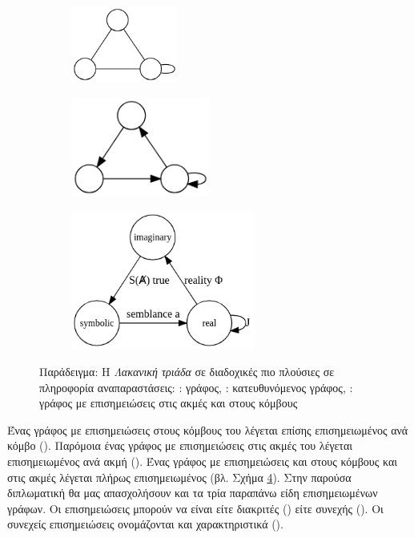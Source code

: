 \begin{figure}[ht]%
\centering
  \begin{subfigure}[α]{0.33\linewidth}
    \centering\includegraphics[width=100pt]{figures/lacan_a}
    \caption{\label{lac:a}}
  \end{subfigure}%
  \begin{subfigure}[β]{0.33\linewidth}
    \centering\includegraphics[width=130pt]{figures/lacan_b}
    \caption{\label{lac:b}}
  \end{subfigure}
  \begin{subfigure}[γ]{0.33\linewidth}
  \centering\includegraphics[width=170pt]{figures/lacan_c}
  \caption{\label{lac:c}}
  \end{subfigure}

  \caption{Παράδειγμα: H \textit{Λακανική τριάδα} σε διαδοχικές πιο πλούσιες σε πληροφορία αναπαραστάσεις: : γράφος, : κατευθυνόμενος γράφος, : γράφος με επισημειώσεις στις ακμές και στους κόμβους}
\label{lac}
\end{figure}

Ένας γράφος με επισημειώσεις στους κόμβους του λέγεται επίσης επισημειωμένος ανά κόμβο ().
Παρόμοια ένας γράφος με επισημειώσεις στις ακμές του λέγεται επισημειωμένος ανά ακμή ().
Ένας γράφος με επισημειώσεις και στους κόμβους και στις ακμές λέγεται πλήρως επισημειωμένος (βλ. Σχήμα \ref{lac}).
Στην παρούσα διπλωματική θα μας απασχολήσουν και τα τρία παραπάνω είδη επισημειωμένων γράφων. Οι επισημειώσεις μπορούν να είναι είτε διακριτές () είτε συνεχής ().
Οι συνεχείς επισημειώσεις ονομάζονται και χαρακτηριστικά ().

